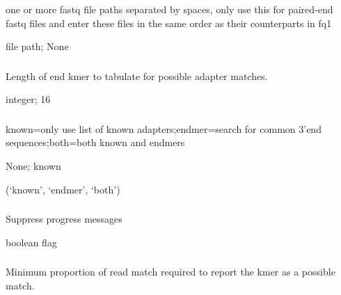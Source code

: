 \documentclass[letterpaper,10pt,english]{sphinxmanual}
\begin{document}
\subsubsection{}
\label{\detokenize{prog_desc:fq2}}
 one or more fastq file paths separated by spaces, only use this for paired-end fastq files and enter these files in the same order as their counterparts in \textendash{}fq1

 file path;  None


\subsubsection{}
\label{\detokenize{prog_desc:k-end-klength}}
 Length of end kmer to tabulate for possible adapter matches.

 integer;  16


\subsubsection{}
\label{\detokenize{prog_desc:m-mode}}
 known=only use list of known adapters;endmer=search for common 3’end sequences;both=both known and endmers

 None;  known

 (‘known’, ‘endmer’, ‘both’)


\subsubsection{}
\label{\detokenize{prog_desc:quiet}}
 Suppress progress messages

 boolean flag


\subsubsection{}
\label{\detokenize{prog_desc:m-min-match}}
 Minimum proportion of read match required to report the kmer as a possible match.
\end{document}

